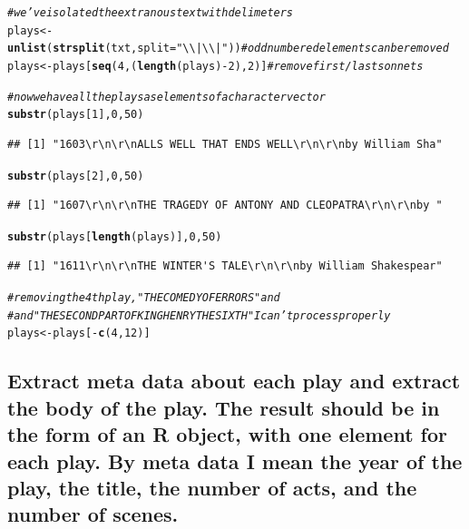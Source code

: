 \documentclass{article}\usepackage[]{graphicx}\usepackage[]{color}
\makeatletter
\newcommand{\hlnum}[1]{\textcolor[rgb]{0.686,0.059,0.569}{#1}}%
\newcommand{\hlstr}[1]{\textcolor[rgb]{0.192,0.494,0.8}{#1}}%
\newcommand{\hlcom}[1]{\textcolor[rgb]{0.678,0.584,0.686}{\textit{#1}}}%
\newcommand{\hlopt}[1]{\textcolor[rgb]{0,0,0}{#1}}%
\newcommand{\hlstd}[1]{\textcolor[rgb]{0.345,0.345,0.345}{#1}}%
\newcommand{\hlkwb}[1]{\textcolor[rgb]{0.69,0.353,0.396}{#1}}%
\newcommand{\hlkwc}[1]{\textcolor[rgb]{0.333,0.667,0.333}{#1}}%
\newcommand{\hlkwd}[1]{\textcolor[rgb]{0.737,0.353,0.396}{\textbf{#1}}}%
\newenvironment{kframe}{%
 \def\at@end@of@kframe{}%
 \ifinner\ifhmode%
  \def\at@end@of@kframe{\end{minipage}}%
  \begin{minipage}{\columnwidth}%
 \fi\fi%
 \def\FrameCommand##1{\hskip\@totalleftmargin \hskip-\fboxsep
 \colorbox{shadecolor}{##1}\hskip-\fboxsep
     \hskip-\linewidth \hskip-\@totalleftmargin \hskip\columnwidth}%
 \MakeFramed {\advance\hsize-\width
   \@totalleftmargin\z@ \linewidth\hsize
   \@setminipage}}%
 {\par\unskip\endMakeFramed%
 \at@end@of@kframe}
\newenvironment{knitrout}{}{} %
\makeatother
\begin{document}
\begin{knitrout}
\begin{kframe}
\begin{alltt}
\hlcom{#we've isolated the extranous text with delimeters }
\hlstd{plays} \hlkwb{<-} \hlkwd{unlist}\hlstd{(}\hlkwd{strsplit}\hlstd{(txt,} \hlkwc{split}\hlstd{=}\hlstr{"\textbackslash{}\textbackslash{}|\textbackslash{}\textbackslash{}|"}\hlstd{))} \hlcom{#odd numbered elements can be removed}
\hlstd{plays} \hlkwb{<-} \hlstd{plays[}\hlkwd{seq}\hlstd{(}\hlnum{4}\hlstd{, (}\hlkwd{length}\hlstd{(plays)}\hlopt{-}\hlnum{2}\hlstd{),} \hlnum{2}\hlstd{)]} \hlcom{#remove first/last sonnets}

\hlcom{#now we have all the plays as elements of a character vector}
\hlkwd{substr}\hlstd{(plays[}\hlnum{1}\hlstd{],} \hlnum{0}\hlstd{,} \hlnum{50}\hlstd{)}
\end{alltt}
\begin{verbatim}
## [1] "1603\r\n\r\nALLS WELL THAT ENDS WELL\r\n\r\nby William Sha"
\end{verbatim}
\begin{alltt}
\hlkwd{substr}\hlstd{(plays[}\hlnum{2}\hlstd{],} \hlnum{0}\hlstd{,} \hlnum{50}\hlstd{)}
\end{alltt}
\begin{verbatim}
## [1] "1607\r\n\r\nTHE TRAGEDY OF ANTONY AND CLEOPATRA\r\n\r\nby "
\end{verbatim}
\begin{alltt}
\hlkwd{substr}\hlstd{(plays[}\hlkwd{length}\hlstd{(plays)],} \hlnum{0}\hlstd{,} \hlnum{50}\hlstd{)}
\end{alltt}
\begin{verbatim}
## [1] "1611\r\n\r\nTHE WINTER'S TALE\r\n\r\nby William Shakespear"
\end{verbatim}
\begin{alltt}
\hlcom{#removing the 4th play, "THE COMEDY OF ERRORS" and }
\hlcom{# and "THE SECOND PART OF KING HENRY THE SIXTH" I can't process properly}
\hlstd{plays} \hlkwb{<-} \hlstd{plays[}\hlopt{-}\hlkwd{c}\hlstd{(}\hlnum{4}\hlstd{,}\hlnum{12}\hlstd{)]}
\end{alltt}
\end{kframe}
\end{knitrout}

\subsection{Extract meta data about each play and extract the body of the play. The result should be in the form of an R object, with one element for each play. By meta data I mean the year of the play, the title, the number of acts, and the number of scenes.} %
\end{document}
